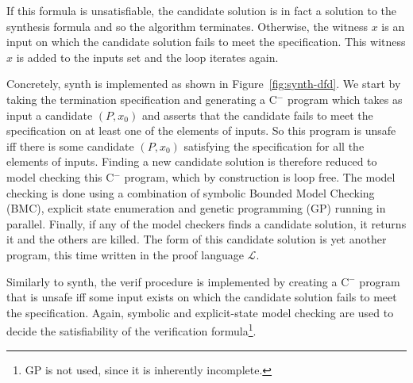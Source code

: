\documentclass[preprint]{sigplanconf}
\theoremstyle{definition}
\newcommand{\newC}{C$^-$\xspace}
\begin{document}
If this formula is unsatisfiable, the candidate solution is in fact a
solution to the synthesis formula and so the algorithm terminates. 
Otherwise, the witness $x$ is an input on which the candidate solution fails
to meet the specification.  This witness $x$ is added to the {\sc inputs}
set and the loop iterates again.

Concretely, {\sc synth} is implemented as shown in
Figure~\ref{fig:synth-dfd}.  We start by taking the termination
specification and generating a \newC program which takes as input a candidate
$(P, x_0)$ and asserts that the candidate fails to meet the specification on
at least one of the elements of {\sc inputs}.  So this program is unsafe iff
there is some candidate $(P, x_0)$ satisfying the specification for all the
elements of {\sc inputs}.  Finding a new candidate solution is therefore
reduced to model checking this \newC program, which by construction is loop
free.  The model checking is done using a combination of symbolic Bounded Model
Checking (BMC), explicit state enumeration and genetic programming (GP) running in
parallel.
Finally, if any of the model checkers finds a candidate solution, it returns it
and the others are killed.  The form of
this candidate solution is yet another program, this time written in the
proof language $\mathcal{L}$.


Similarly to {\sc synth}, the {\sc verif} procedure is implemented by
creating a \newC program that is unsafe iff some input exists on which the
candidate solution fails to meet the specification.  Again, symbolic and
explicit-state model checking are used to decide the satisfiability of the
verification formula\footnote{GP is not used, since it is inherently incomplete.}.
\end{document}
